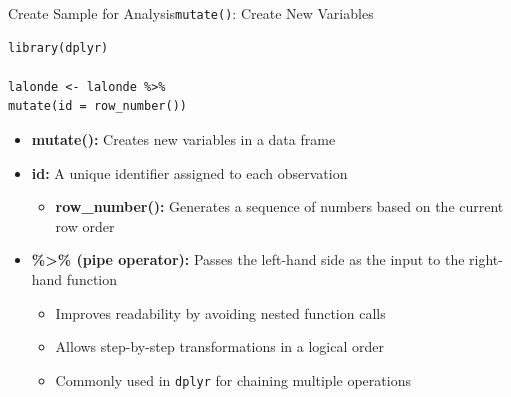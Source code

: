\documentclass[hyperref={pdfpagelabels=false}]{beamer}
\begin{document}
\begin{frame}[fragile]{Create Sample for Analysis}{\texttt{mutate()}: Create New Variables}
\begin{lstlisting}
library(dplyr)

lalonde <- lalonde %>%
mutate(id = row_number())
\end{lstlisting}
\begin{itemize}
	\vspace{0.2cm}
	\item \textbf{mutate():} Creates new variables in a data frame
	\vspace{0.2cm}
	\item \textbf{id:} A unique identifier assigned to each observation
	\vspace{0.2cm}
	\begin{itemize}
		\item \textbf{row\_number():} Generates a sequence of numbers based on the current row order
	\end{itemize}
	\vspace{0.2cm}
	\item \textbf{\%>\% (pipe operator):} Passes the left-hand side as the input to the right-hand function
	\vspace{0.2cm}
	\begin{itemize}
		\item Improves readability by avoiding nested function calls
		\vspace{0.2cm}
		\item Allows step-by-step transformations in a logical order
		\vspace{0.2cm}
		\item Commonly used in \texttt{dplyr} for chaining multiple operations
	\end{itemize}
\end{itemize}
\end{frame}
\end{document}
